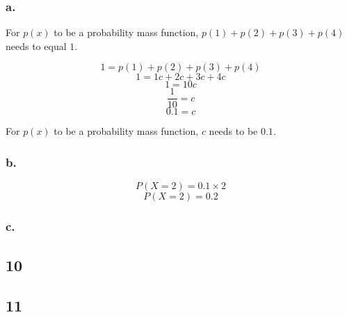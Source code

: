 \documentclass[11pt]{article}
\begin{document}
\subsubsection{a.}
For $p(x)$ to be a probability mass function, $p(1)+p(2)+p(3)+p(4)$ needs to
equal $1$. 

\[ 1 = p(1)+p(2)+p(3)+p(4) \]
\[ 1 = 1c+2c+3c+4c \]
\[ 1 = 10c \]
\[ \frac{1}{10} = c \]
\[ 0.1 = c \]

For $p(x)$ to be a probability mass function, $c$ needs to be $0.1$. 

\subsubsection{b.}
\[ P(X=2) = 0.1 \times 2 \]
\[ P(X=2) = 0.2 \]

\subsubsection{c.}


\subsection{10}

\subsection{11}
\end{document}

